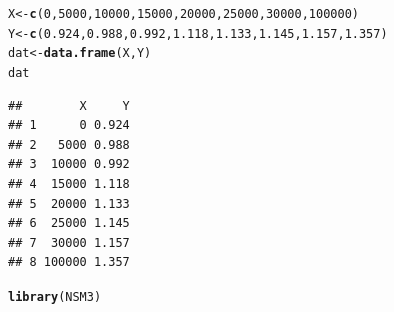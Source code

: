 \documentclass[a4paper]{article}\usepackage[]{graphicx}\usepackage[]{color}
\makeatletter
\newcommand{\hlnum}[1]{\textcolor[rgb]{0.686,0.059,0.569}{#1}}%
\newcommand{\hlstd}[1]{\textcolor[rgb]{0.345,0.345,0.345}{#1}}%
\newcommand{\hlkwb}[1]{\textcolor[rgb]{0.69,0.353,0.396}{#1}}%
\newcommand{\hlkwd}[1]{\textcolor[rgb]{0.737,0.353,0.396}{\textbf{#1}}}%
\newenvironment{kframe}{%
 \def\at@end@of@kframe{}%
 \ifinner\ifhmode%
  \def\at@end@of@kframe{\end{minipage}}%
  \begin{minipage}{\columnwidth}%
 \fi\fi%
 \def\FrameCommand##1{\hskip\@totalleftmargin \hskip-\fboxsep
 \colorbox{shadecolor}{##1}\hskip-\fboxsep
     \hskip-\linewidth \hskip-\@totalleftmargin \hskip\columnwidth}%
 \MakeFramed {\advance\hsize-\width
   \@totalleftmargin\z@ \linewidth\hsize
   \@setminipage}}%
 {\par\unskip\endMakeFramed%
 \at@end@of@kframe}
\newenvironment{knitrout}{}{} %
\makeatother
\begin{document}
\begin{knitrout}
\color{fgcolor}\begin{kframe}
\begin{alltt}
\hlstd{X} \hlkwb{<-} \hlkwd{c}\hlstd{(}\hlnum{0}\hlstd{,} \hlnum{5000}\hlstd{,} \hlnum{10000}\hlstd{,} \hlnum{15000}\hlstd{,} \hlnum{20000}\hlstd{,} \hlnum{25000}\hlstd{,} \hlnum{30000}\hlstd{,} \hlnum{100000} \hlstd{)}
\hlstd{Y} \hlkwb{<-} \hlkwd{c}\hlstd{(}\hlnum{0.924}\hlstd{,} \hlnum{0.988}\hlstd{,} \hlnum{0.992}\hlstd{,} \hlnum{1.118}\hlstd{,} \hlnum{1.133}\hlstd{,} \hlnum{1.145}\hlstd{,} \hlnum{1.157}\hlstd{,} \hlnum{1.357}\hlstd{)}
\hlstd{dat} \hlkwb{<-} \hlkwd{data.frame}\hlstd{(X, Y)}
\hlstd{dat}
\end{alltt}
\begin{verbatim}
##        X     Y
## 1      0 0.924
## 2   5000 0.988
## 3  10000 0.992
## 4  15000 1.118
## 5  20000 1.133
## 6  25000 1.145
## 7  30000 1.157
## 8 100000 1.357
\end{verbatim}
\begin{alltt}
\hlkwd{library}\hlstd{(NSM3)}
\end{alltt}



\end{kframe}
\end{knitrout}
\end{document}

